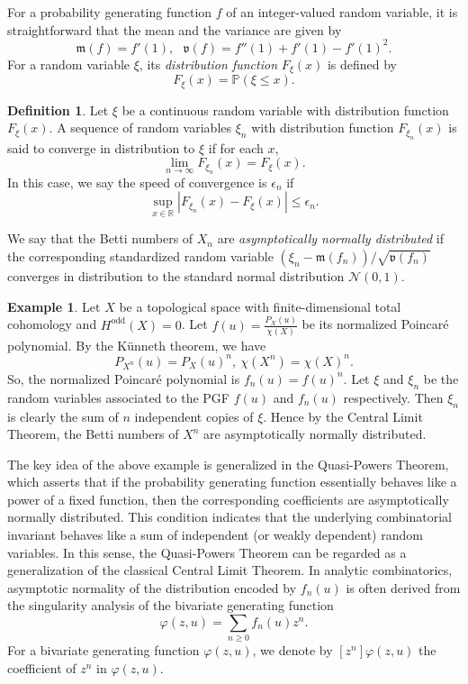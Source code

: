 \documentclass[11pt,letterpaper]{amsart}
\numberwithin{equation}{section}
\theoremstyle{definition}
\newtheorem{definition}[theorem]{Definition}
\newtheorem{example}[theorem]{Example}
\newcommand{\PP}{\mathbb{P}}
\def\RR{\mathbb{R}}
\newcommand{\cal}{\mathcal}
\def\cN{{\cal N}}
\begin{document}
For a probability generating function $f$ of an integer-valued random variable, it is straightforward that the mean and the variance are given by
\[\mathfrak{m}(f)=f'(1), \ \ \ \mathfrak{v}(f)= f''(1)+f'(1)-f'(1)^2 .\]
For a random variable $\xi$, its \emph{distribution function} $F_{\xi}(x)$ is defined by
\[F_{\xi}(x)=\PP(\xi \le x). \]
\begin{definition}
   Let $\xi$ be a continuous random variable with distribution function $F_{\xi}(x)$. A sequence of random variables $\xi_n$ with distribution function $F_{\xi_n}(x)$ is said to converge in distribution to $\xi$ if for each $x$,
    \[\lim_{n\to \infty} F_{\xi_n}(x) =F_{\xi}(x).\]
   In this case, we say the speed of convergence is $\epsilon_n$ if
   \[ \sup_{x\in \RR} |F_{\xi_n}(x) - F_{\xi}(x)|\le \epsilon_n. \]
\end{definition}

We say that the Betti numbers of $X_n$ are \emph{asymptotically normally distributed} if the corresponding standardized random variable $(\xi_n-\mathfrak{m}(f_n))/\sqrt{\mathfrak{v}(f_n)}$ converges in distribution to the standard normal distribution $\cN(0,1)$.

\begin{example}
Let $X$ be a topological space with finite-dimensional total cohomology and $H^{\text{odd}}(X)=0$. Let $f(u)=\frac{P_X(u)}{\chi(X)}$ be its normalized Poincar\'e polynomial. By the K\"unneth theorem, we have
\[ P_{X^n }(u) = P_X(u)^n, \  \chi(X^n)= \chi(X)^n. \]
So, the normalized Poincar\'e polynomial is $f_n(u)=f(u)^n$. Let $\xi$ and $\xi_n$ be the random variables associated to the PGF $f(u)$ and $f_n(u)$ respectively. Then $\xi_n$ is clearly the sum of $n$ independent copies of $\xi$. Hence by the Central Limit Theorem, the Betti numbers of $X^n$ are asymptotically normally distributed.
\end{example}

The key idea of the above example is generalized in the Quasi-Powers Theorem, which asserts that if the probability generating function essentially behaves like a power of a fixed function, then the corresponding coefficients are asymptotically normally distributed. This condition indicates that the underlying combinatorial invariant behaves like a sum of independent (or weakly dependent) random variables. In this sense, the Quasi-Powers Theorem can be regarded as a generalization of the classical Central Limit Theorem. In analytic combinatorics, asymptotic normality of the distribution encoded by $f_n(u)$ is often derived from the singularity analysis of the bivariate generating function \[\varphi(z, u)= \sum_{n\ge 0} f_n(u)z^n .\]
For a bivariate generating function $\varphi(z, u)$, we denote by $[z^n]\varphi(z,u)$ the coefficient of $z^n$ in $\varphi(z,u)$.
\end{document}
